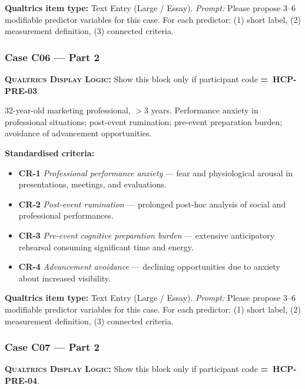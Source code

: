 \documentclass[11pt,a4paper]{article}
\newcommand{\responsetextarea}[1]{\begin{tcolorbox}[colback=ResponseBG,colframe=GoldAmber,boxrule=0.6pt,arc=1.5mm,left=6pt,right=6pt,top=5pt,bottom=5pt]\small\textbf{\color{GoldAmber}Qualtrics item type:} Text Entry (Large / Essay). \quad \textit{Prompt:} #1\end{tcolorbox}}
\newcommand{\dlnote}[1]{\par\vspace{0.15em}\noindent\begin{tcolorbox}[colback=AccentAmber,colframe=GoldAmber,boxrule=0.45pt,arc=1mm,left=5pt,right=5pt,top=2.5pt,bottom=2.5pt]\footnotesize\textbf{\color{GoldAmber}\scshape Qualtrics Display Logic:} Show this block only if participant code \textbf{=~#1}.\end{tcolorbox}\vspace{0.1em}}
\begin{document}
\responsetextarea{Please propose 3--6 modifiable predictor variables for this case. For each predictor: (1) short label, (2) measurement definition, (3) connected criteria.}

\vspace{0.4em}

\subsubsection*{Case C06 --- Part 2}
\dlnote{HCP-PRE-03}

\begin{complaintbox}[title=Case C06 --- Complaint (abbreviated)]
\small 32-year-old marketing professional, $>$3 years. Performance anxiety in professional situations; post-event rumination; pre-event preparation burden; avoidance of advancement opportunities.
\end{complaintbox}

\begin{contextbox}
\small\textbf{Standardised criteria:}
\begin{itemize}[topsep=2pt,itemsep=1pt]
\item \textbf{CR-1} \textit{Professional performance anxiety} --- fear and physiological arousal in presentations, meetings, and evaluations.
\item \textbf{CR-2} \textit{Post-event rumination} --- prolonged post-hoc analysis of social and professional performances.
\item \textbf{CR-3} \textit{Pre-event cognitive preparation burden} --- extensive anticipatory rehearsal consuming significant time and energy.
\item \textbf{CR-4} \textit{Advancement avoidance} --- declining opportunities due to anxiety about increased visibility.
\end{itemize}
\end{contextbox}

\responsetextarea{Please propose 3--6 modifiable predictor variables for this case. For each predictor: (1) short label, (2) measurement definition, (3) connected criteria.}

\vspace{0.4em}

\subsubsection*{Case C07 --- Part 2}
\dlnote{HCP-PRE-04}
\end{document}
